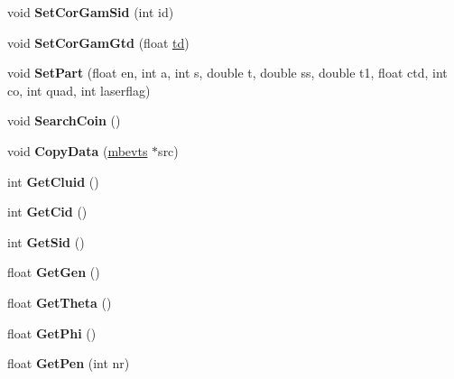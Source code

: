 \begin{DoxyCompactItemize}
\mbox{\label{classmbevts_ac45f4603202f0ab85a53eaa5a673bef5}} 
void {\bfseries Set\+Cor\+Gam\+Sid} (int id)
\item 
\mbox{\label{classmbevts_ad7d391a92762ab040292cb7b3e8418d2}} 
void {\bfseries Set\+Cor\+Gam\+Gtd} (float \hyperlink{classmbevts_a577bfcdc97c54ad53a452200dff118e2}{td})
\item 
\mbox{\label{classmbevts_a22851a0facbaef765719ba81163f9fbf}} 
void {\bfseries Set\+Part} (float en, int a, int s, double t, double ss, double t1, float ctd, int co, int quad, int laserflag)
\item 
\mbox{\label{classmbevts_a87461604de891dbc34c31fcd8af590af}} 
void {\bfseries Search\+Coin} ()
\item 
\mbox{\label{classmbevts_a3dd5bb0d3f29f7aacf8fe47a999b145e}} 
void {\bfseries Copy\+Data} (\hyperlink{classmbevts}{mbevts} $\ast$src)
\item 
\mbox{\label{classmbevts_a1c5fb6ab284e545a6b217d62f0071704}} 
int {\bfseries Get\+Cluid} ()
\item 
\mbox{\label{classmbevts_a14e93c89cf1cd54c013258018408f502}} 
int {\bfseries Get\+Cid} ()
\item 
\mbox{\label{classmbevts_a9d6088f98d2cbf47a2b800707f69d329}} 
int {\bfseries Get\+Sid} ()
\item 
\mbox{\label{classmbevts_a77ebeb78945522f0aeeb72f3ba1f7778}} 
float {\bfseries Get\+Gen} ()
\item 
\mbox{\label{classmbevts_aa960d2d6dcb37527ec7c61bb47ae7112}} 
float {\bfseries Get\+Theta} ()
\item 
\mbox{\label{classmbevts_abecac6009c213da0548446729e64767f}} 
float {\bfseries Get\+Phi} ()
\item 
\mbox{\label{classmbevts_a751112e09e3b8743d1470e8ab1191dd1}} 
float {\bfseries Get\+Pen} (int nr)
\item 

\end{DoxyCompactItemize}
